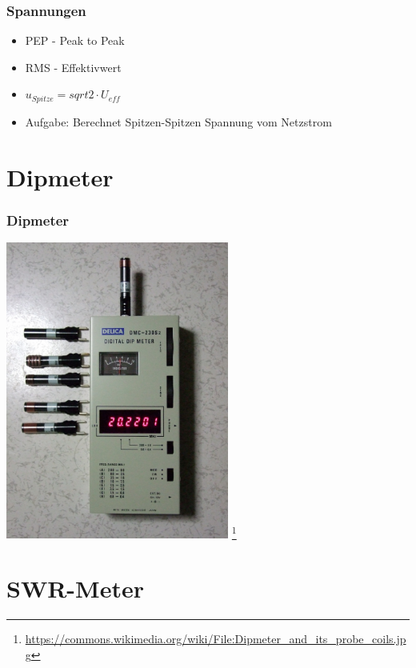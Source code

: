 \begin{frame}
    \frametitle{Spannungen}
    \begin{center}
    \begin{itemize}
			\item PEP - Peak to Peak
			\item RMS - Effektivwert
			\item $u_{Spitze} = sqrt{2} \cdot U_{eff}$ \\
			\item Aufgabe: Berechnet Spitzen-Spitzen Spannung vom Netzstrom 
    \end{itemize}
	\end{center}
\end{frame}

\section*{Dipmeter}

\begin{frame}
    \frametitle{Dipmeter}
    \begin{center}
        \includegraphics[width=0.55\textwidth]{e17/Dipmeter.jpg}
        \footnote{\tiny \url{https://commons.wikimedia.org/wiki/File:Dipmeter_and_its_probe_coils.jpg}}
	\end{center}
\end{frame}

\section*{SWR-Meter}

